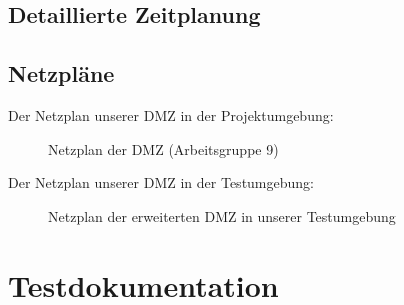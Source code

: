 

\clearpage

\subsection{Detaillierte Zeitplanung}
\label{app:Zeitplanung}
\clearpage



\clearpage

\subsection{Netzpläne}
\label{app:Netzplan}
Der Netzplan unserer DMZ in der Projektumgebung:
\begin{figure}[htb]
\centering
{}
\caption{Netzplan der DMZ (Arbeitsgruppe 9)}
\end{figure}

Der Netzplan unserer DMZ in der Testumgebung:
\begin{figure}[htb]
    \centering
    \caption{Netzplan der erweiterten DMZ in unserer Testumgebung}
\end{figure}
\clearpage

\section{Testdokumentation}



